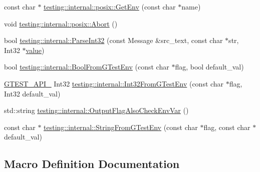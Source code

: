 \begin{DoxyCompactItemize}
const char $\ast$ \mbox{\hyperlink{namespacetesting_1_1internal_1_1posix_aa78973d3f7aa4efd24742b0537c8cd50}{testing\+::internal\+::posix\+::\+Get\+Env}} (const char $\ast$name)
\item 
void \mbox{\hyperlink{namespacetesting_1_1internal_1_1posix_a69b8278c59359dd6a6f941b4643db9fb}{testing\+::internal\+::posix\+::\+Abort}} ()
\item 
bool \mbox{\hyperlink{namespacetesting_1_1internal_ac06fc81336a3d80755f4020d34321766}{testing\+::internal\+::\+Parse\+Int32}} (const Message \&src\+\_\+text, const char $\ast$str, Int32 $\ast$\mbox{\hyperlink{_obj__test_2lib_2googletest-master_2googlemock_2test_2gmock-matchers__test_8cc_a337b8a670efc0b086ad3af163f3121b6}{value}})
\item 
bool \mbox{\hyperlink{namespacetesting_1_1internal_a67132cdce23fb71b6c38ee34ef81eb4c}{testing\+::internal\+::\+Bool\+From\+G\+Test\+Env}} (const char $\ast$flag, bool default\+\_\+val)
\item 
\mbox{\hyperlink{_obj__test_2lib_2googletest-release-1_88_81_2googletest_2include_2gtest_2internal_2gtest-port_8h_aa73be6f0ba4a7456180a94904ce17790}{G\+T\+E\+S\+T\+\_\+\+A\+P\+I\+\_\+}} Int32 \mbox{\hyperlink{namespacetesting_1_1internal_a0f7e728793f9e6cb0aa2b69eaa468bf3}{testing\+::internal\+::\+Int32\+From\+G\+Test\+Env}} (const char $\ast$flag, Int32 default\+\_\+val)
\item 
std\+::string \mbox{\hyperlink{namespacetesting_1_1internal_a0c793c6d84760d900299916c077a1af4}{testing\+::internal\+::\+Output\+Flag\+Also\+Check\+Env\+Var}} ()
\item 
const char $\ast$ \mbox{\hyperlink{namespacetesting_1_1internal_a7ed785df46a339403b0f749d3a879201}{testing\+::internal\+::\+String\+From\+G\+Test\+Env}} (const char $\ast$flag, const char $\ast$default\+\_\+val)
\end{DoxyCompactItemize}


\subsection{Macro Definition Documentation}
\mbox{\label{_obj__test_2lib_2googletest-master_2googletest_2include_2gtest_2internal_2gtest-port_8h_ab389953fc1f7e4efae30d182a0e0a13b}} 
